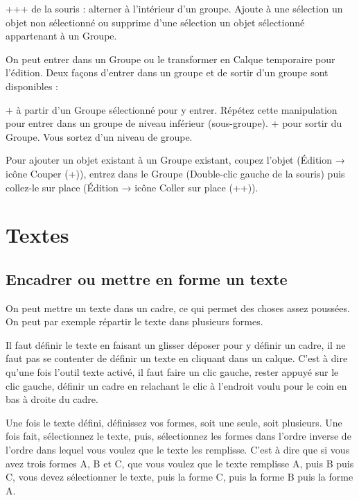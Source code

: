 \documentclass[a4paper,twoside]{article}
\begin{document}
+++ de la souris : alterner à l'intérieur d'un groupe. Ajoute à une sélection un objet non sélectionné ou supprime d'une sélection un objet sélectionné appartenant à un Groupe. 

On peut entrer dans un Groupe ou le transformer en Calque temporaire pour l'édition. Deux façons d'entrer dans un groupe et de sortir d'un groupe sont disponibles :

+ à partir d'un Groupe sélectionné pour y entrer. Répétez cette manipulation pour entrer dans un groupe de niveau inférieur (sous-groupe). + pour sortir du Groupe. Vous sortez d'un niveau de groupe.

\begin{remarque}
Pour ajouter un objet existant à un Groupe existant, coupez l'objet (Édition → icône Couper (+)), entrez dans le Groupe (Double-clic gauche de la souris) puis collez-le sur place (Édition → icône Coller sur place (++)). 
\end{remarque}




\section{Textes}
\subsection{Encadrer ou mettre en forme un texte}
On peut mettre un texte dans un cadre, ce qui permet des choses assez poussées. On peut par exemple répartir le texte dans plusieurs formes. 

\begin{attention}
Il faut définir le texte en faisant un glisser déposer pour y définir un cadre, il ne faut pas se contenter de définir un texte en cliquant dans un calque. C'est à dire qu'une fois l'outil texte activé, il faut faire un clic gauche, rester appuyé sur le clic gauche, définir un cadre en relachant le clic à l'endroit voulu pour le coin en bas à droite du cadre. 
\end{attention}

Une fois le texte défini, définissez vos formes, soit une seule, soit plusieurs. Une fois fait, sélectionnez le texte, puis, sélectionnez les formes dans l'ordre inverse de l'ordre dans lequel vous voulez que le texte les remplisse. C'est à dire que si vous avez trois formes A, B et C, que vous voulez que le texte remplisse A, puis B puis C, vous devez sélectionner le texte, puis la forme C, puis la forme B puis la forme A.
\end{document}
